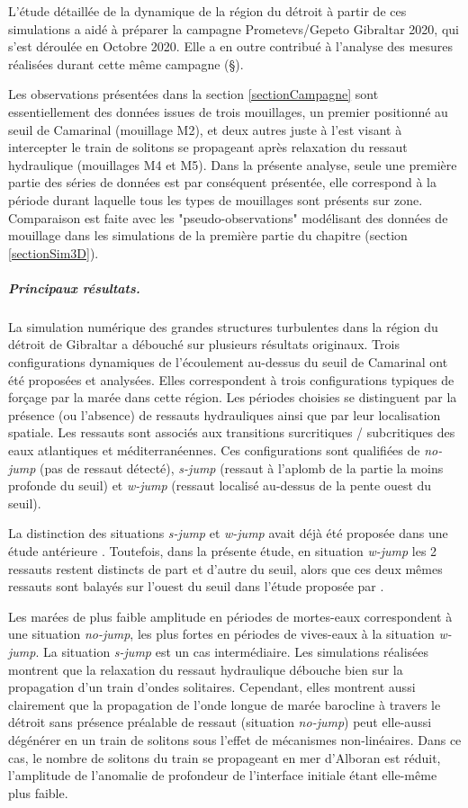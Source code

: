 L'étude détaillée de la dynamique de la région du détroit à partir de ces simulations a aidé à préparer la campagne Prometevs/Gepeto Gibraltar 2020, qui s'est déroulée en Octobre 2020. Elle a en outre contribué à l'analyse des mesures réalisées durant cette même campagne (\S {}).

Les observations présentées dans la section \ref{sectionCampagne} sont essentiellement des données issues de trois mouillages, un premier positionné au seuil de Camarinal (mouillage M2), et deux autres juste à l'est visant à intercepter le train de solitons se propageant après relaxation du ressaut hydraulique (mouillages M4 et M5). Dans la présente analyse, seule une première partie des séries de données est par conséquent présentée, elle correspond à la période durant laquelle tous les types de mouillages sont présents sur zone. Comparaison est faite avec les "pseudo-observations" modélisant des données de mouillage dans les simulations de la première partie du chapitre (section \ref{sectionSim3D}).

\subparagraph{Principaux résultats.}
La simulation numérique des grandes structures turbulentes dans la région du détroit de Gibraltar a débouché sur plusieurs résultats originaux. Trois configurations dynamiques de l'écoulement au-dessus du seuil de Camarinal ont été proposées et analysées. Elles correspondent à trois configurations typiques de forçage par la marée dans cette région. Les périodes choisies se distinguent par la présence (ou l'absence) de ressauts hydrauliques ainsi que par leur localisation spatiale. Les ressauts sont associés aux transitions surcritiques / subcritiques des eaux atlantiques et méditerranéennes. Ces configurations sont qualifiées de \textit{no-jump} (pas de ressaut détecté), \textit{s-jump} (ressaut à l'aplomb de la partie la moins profonde du seuil) et \textit{w-jump} (ressaut localisé au-dessus de la pente ouest du seuil).

La distinction des situations \textit{s-jump} et \textit{w-jump} avait déjà été proposée dans une étude antérieure \citep{sanchez-garrido_2011}. Toutefois, dans la présente étude, en situation \textit{w-jump} les 2 ressauts restent distincts de part et d'autre du seuil, alors que ces deux mêmes ressauts sont balayés sur l'ouest du seuil dans l'étude proposée par \citet{sanchez-garrido_2011}.

Les marées de plus faible amplitude en périodes de mortes-eaux correspondent à une situation \textit{no-jump}, les plus fortes en périodes de vives-eaux à la situation \textit{w-jump}. La situation \textit{s-jump} est un cas intermédiaire. Les simulations réalisées montrent que la relaxation du ressaut hydraulique débouche bien sur la propagation d'un train d'ondes solitaires. Cependant, elles montrent aussi clairement que la propagation de l'onde longue de marée barocline à travers le détroit sans présence préalable de ressaut (situation  \textit{no-jump}) peut elle-aussi dégénérer en un train de solitons sous l'effet de mécanismes non-linéaires. Dans ce cas, le nombre de solitons du train se propageant en mer d'Alboran est réduit, l'amplitude de l'anomalie de profondeur de l'interface initiale étant elle-même plus faible.

